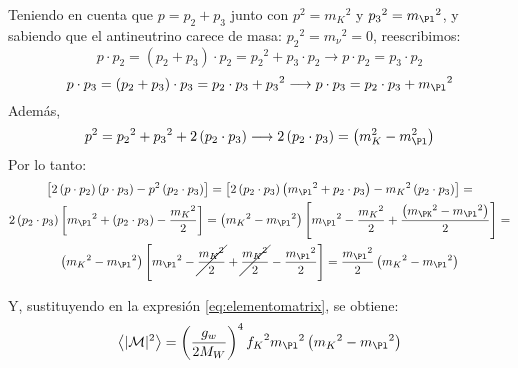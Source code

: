 Teniendo en cuenta que $p=p_{2}+p_{3}$ junto con $p^2={m_K}^2$ y ${p_3}^2={m_{\Pl}}^2$, y sabiendo que el antineutrino carece de masa: ${p_2}^2={m_{\nu}}^2=0$, reescribimos:
\begin{equation}
p \cdot p_{2} = \left( p_{2}+ p_{3}\right) \cdot p_{2} = {p_2}^{2}+ p_{3} \cdot p_{2} \longrightarrow p\cdot p_{2}= p_{3} \cdot p_{2}
\end{equation}
\begin{equation}
p \cdot p_{3}=\left( p_{2}+ p_{3}\right) \cdot p_{3} = p_{2} \cdot p_{3}+ {p_{3}}^2 \longrightarrow p \cdot p_{3} = p_{2} \cdot p_{3}+{m_{\Pl}}^2
\end{equation}
Además,
\begin{equation}
p^{2}={p_{2}}^{2}+{p_3}^{2}+2\left( p_{2} \cdot p_{3}\right) \longrightarrow 2\left( p_{2} \cdot p_{3}\right)=\left( m_{K}^{2}-m_{\Pl}^{2}\right)
\end{equation}
Por lo tanto:
\begin{multline}
\left[ 2\left( p\cdot p_{2}\right) \left( p\cdot p_{3}\right) -p^{2}\left( p_{2}\cdot p_{3}\right) \right] = \left[ 2\left( p_{2}\cdot p_{3}\right) \left( {m_{\Pl}}^{2}+p_{2}\cdot p_{3}\right) -{m_{K}}^{2}\left( p_{2}\cdot p_{3}\right) \right] = \\ 2\left( p_{2} \cdot p_{3}\right) \left[ {m_{\Pl}}^{2}+\left( p_{2}\cdot p_{3}\right) -\dfrac{{m_K}^{2}}{2}\right] = \left({m_{K}}^{2}-{m_{\Pl}}^{2}\right) \left[{m_{\Pl}}^{2}-\dfrac{{m_K}^{2}}{2}+\dfrac{\left({m_{\PK}}^{2}-{m_{\Pl}}^{2}\right) }{2}\right] =\\ \left({m_{K}}^{2}-{m_{\Pl}}^{2}\right) \left[{m_{\Pl}}^{2}-\cancel{\dfrac{{m_{K}}^{2}}{2}}+\cancel{\dfrac{{m_{K}}^{2}}{2}}-\dfrac{{m_{\Pl}}^{2}}{2}\right] =\dfrac{{m_{\Pl}}^{2}}{2}\left( {m_{K}}^{2}-{m_{\Pl}}^{2}\right) 
\end{multline}

Y, sustituyendo en la expresión \ref{eq:elementomatrix}, se obtiene:
\begin{equation}
\left\langle |\mathcal{M}|^{2}\right\rangle=\left( \dfrac{g_w}{2M_W}\right)^{4} {f_K}^2 {m_{\Pl}}^{2}\left( {m_{K}}^{2}-{m_{\Pl}}^{2}\right)\label{eq:averageM}
\end{equation}